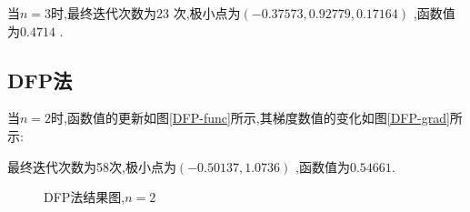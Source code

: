     当$ n=3 $时,最终迭代次数为$23$ 次,极小点为$ (-0.37573,0.92779,0.17164) $ ,函数值为$ 0.4714 $ .

    \subsection{DFP法}
    当$ n=2 $时,函数值的更新如图\ref{DFP-func}所示,其梯度数值的变化如图\ref{DFP-grad}所示:
    \par
    最终迭代次数为58次,极小点为$ (-0.50137,1.0736) $ ,函数值为$ 0.54661. $ 
    \begin{figure}[htbp!]
        \centering
        \caption{DFP法结果图,$ n=2 $ }
    \end{figure}

